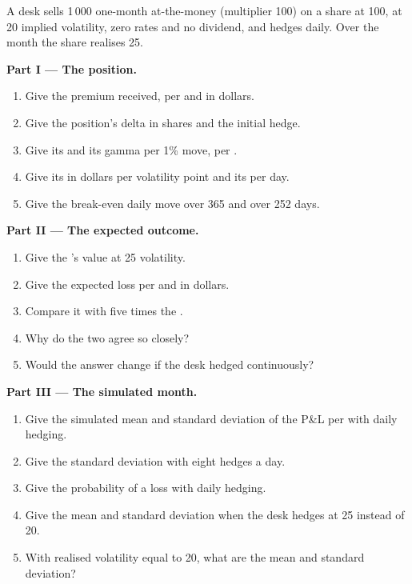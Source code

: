 \begin{problem}\label{pb:dv:greeks-and-the-hedging-pnl:1}
A desk sells 1\,000 one-month at-the-money  (multiplier 100) on a share at
100, at 20 implied volatility, zero rates and no dividend, and hedges daily. Over the
month the share realises 25.

\medskip\noindent\textbf{Part I --- The position.}
\begin{enumerate}
\item Give the premium received, per  and in dollars.
\item Give the position's delta in shares and the initial hedge.
\item Give its  and its gamma per 1\% move, per .
\item Give its  in dollars per volatility point and its  per day.
\item Give the break-even daily move over 365 and over 252 days.
\end{enumerate}

\medskip\noindent\textbf{Part II --- The expected outcome.}
\begin{enumerate}[resume]
\item Give the 's value at 25 volatility.
\item Give the expected loss per  and in dollars.
\item Compare it with five times the .
\item Why do the two agree so closely?
\item Would the answer change if the desk hedged continuously?
\end{enumerate}

\medskip\noindent\textbf{Part III --- The simulated month.}
\begin{enumerate}[resume]
\item Give the simulated mean and standard deviation of the P\&L per  with daily hedging.
\item Give the standard deviation with eight hedges a day.
\item Give the probability of a loss with daily hedging.
\item Give the mean and standard deviation when the desk hedges at 25 instead of 20.
\item With realised volatility equal to 20, what are the mean and standard deviation?
\end{enumerate}


\end{problem}
